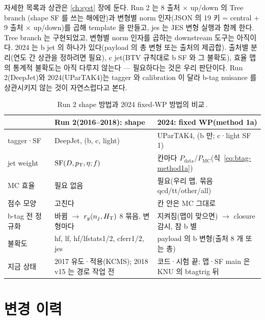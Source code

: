 자세한 목록과 상관은 \ref{ch:syst} 장에 둔다. Run 2 는 8 출처 $\times$ up/down 의 Tree branch (shape SF 를 쓰는
해에만)과 변형별 norm 인자(JSON 의 19 키 = central + 9 출처 $\times$ up/down)를 곱해 template 을 만들고, jes 는 JES 변형 실행과 함께
한다. Tree branch 는 구현되었고\tagimpl,
변형별 norm 인자를 곱하는 downstream 도구는 아직이다\tagplan. 2024 는 b jet 의  하나가 있다(payload 의 총 변형 또는
출처의 제곱합)\tagimpl. 출처별 분리(연도 간 상관을 정하려면 필요), c jet(BTV 규칙대로 b SF 와 그 불확도), 효율
맵의 통계적 불확도는 아직 다루지 않는다 --- 필요하다는 것은 우리 판단이다\tagopen. Run 2(DeepJet)와 2024(UParTAK4)는 tagger 와 calibration 이
달라 b-tag nuisance 를 상관시키지 않는 것이 자연스럽다고 본다\tagours.

\begin{table}[htbp]
\caption{Run 2 shape 방법과 2024 fixed-WP 방법의 비교\,.}
\label{tab:btag-compare}
\centering\small
\begin{tabularx}{\textwidth}{@{}p{2.6cm}L L@{}}
\toprule
 & Run 2(2016–2018): shape & 2024: fixed WP(method 1a) \\
\midrule
tagger·SF & DeepJet, (b, c, light) & UParTAK4, (b 만; c·light SF 1) \\
jet weight & $\mathrm{SF}(D,p_{\mathrm{T}},\eta;f)$ & 칸마다 $P_\text{data}/P_\text{MC}$(식~\eqref{eq:btag-method1a}) \\
MC 효율 & 필요 없음 & 필요(우리 맵, 묶음 qcd/tt/other/all) \\
점수 모양 & 고친다 & 칸 안은 MC 그대로 \\
b-tag 전 정규화 & 바뀜 $\to$ $r_g(n_j, H_{\mathrm{T}})$ 8 묶음, 변형마다 & 지켜짐(맵이 맞으면) $\to$ closure 감시, 참 b 별 \\
불확도 & hf, lf, hf/lfstats1/2, cferr1/2, jes & payload 의 b 변형(출처 8 개 또는 총) \\
지금 상태 & 2017 유도·적용(KCMS); 2018 v15 는 경로 작업 전 & 코드·시험 끝; 맵·SF main 은 KNU 의 btagtrig 뒤 \\
\bottomrule
\end{tabularx}
\end{table}

\section{변경 이력}\label{sec:btag-history}


